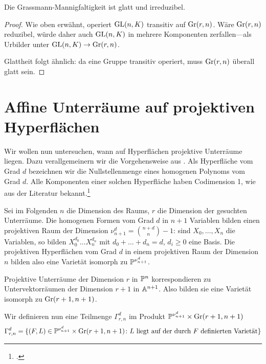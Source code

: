 \begin{prop}
Die Grassmann-Mannigfaltigkeit ist glatt und irreduzibel.
\end{prop}
\begin{proof}
Wie oben erwähnt, operiert $\mathrm{GL}(n,K)$ transitiv auf $\grass r/n$. Wäre $\grass r/n$ reduzibel, würde daher auch $\mathrm{GL}(n,K)$ in mehrere Komponenten zerfallen---als Urbilder unter $\GL nK \to \grass r/n$.

Glattheit folgt ähnlich: da eine Gruppe transitiv operiert, muss $\grass r/n$ überall glatt sein.
\end{proof}

\section{Affine Unterräume auf projektiven Hyperflächen} \label{sec:linesproj}
Wir wollen nun untersuchen, wann auf Hyperflächen projektive Unterräume liegen. Dazu verallgemeinern wir die Vorgehensweise aus \cite[S.~78ff]{Shafarevich}. Als Hyperfläche vom Grad $d$ bezeichnen wir die Nullstellenmenge eines homogenen Polynoms vom Grad $d$. Alle Komponenten einer solchen Hyperfläche haben Codimension 1, wie aus der Literatur bekannt.\footcite[siehe][S.~74, Theorem~4]{Shafarevich}

Sei im Folgenden $n$ die Dimension des Raums, $r$ die Dimension der gesuchten Unterräume. Die homogenen Formen vom Grad $d$ in $n+1$ Variablen bilden einen projektiven Raum der Dimension $\nu_{n+1}^d = \binom{n+d}{n} - 1$: sind $X_0, \dots, X_n$ die Variablen, so bilden $X_0^{d_0} \dots X_n^{d_n}$ mit $d_0 + \dots + d_n = d$, $d_i \geq 0$ eine Basis. Die projektiven Hyperflächen vom Grad $d$ in einem projektiven Raum der Dimension $n$ bilden also eine Varietät isomorph zu $\mathbb P^{\nu_{n+1}^d}$.

Projektive Unterräume der Dimension $r$ in $\mathbb P^{n}$ korrespondieren zu Untervektorräumen der Dimension $r+1$ in $\mathbb A^{n+1}$. Also bilden sie eine Varietät isomorph zu $\grass r+1/{n+1}$.

Wir definieren nun eine Teilmenge $\Gamma_{r,n}^d$ im Produkt $\proj{\nu_{n+1}^d} \times \grass r+1/{n+1}$
\begin{equation}
\Gamma_{r,n}^d = \{(F,L) \in \mathbb P^{\nu_{n+1}^d} \times \grass r+1/{n+1} \colon \text{$L$ liegt auf der durch $F$ definierten Varietät} \}
\end{equation}

